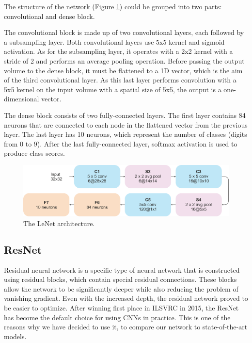 The structure of the network (Figure \ref{img:lenet}) could be grouped into two parts: convolutional and dense block. 

The convolutional block is made up of two convolutional layers, each followed by a subsampling layer. Both convolutional layers use 5x5 kernel and sigmoid activation. As for the subsampling layer, it operates with a 2x2 kernel with a stride of 2 and performs an average pooling operation. Before passing the output volume to the dense block, it must be flattened to a 1D vector, which is the aim of the third convolutional layer. As this last layer performs convolution with a 5x5 kernel on the input volume with a spatial size of 5x5, the output is a one-dimensional vector.  

The dense block consists of two fully-connected layers. The first layer contains 84 neurons that are connected to each node in the flattened vector from the previous layer. The last layer has 10 neurons, which represent the number of classes (digits from 0 to 9). After the last fully-connected layer, softmax activation is used to produce class scores. 

\begin{figure}[h]
    \centering
    \includegraphics[width=.8\textwidth]{images/lenet.png}
    \caption{The LeNet architecture.}
    \label{img:lenet}
\end{figure}

\subsection{ResNet}

Residual neural network \cite{resnet2015} is a specific type of neural network that is constructed using residual blocks, which contain special residual connections. These blocks allow the network to be significantly deeper while also reducing the problem of vanishing gradient. Even with the increased depth, the residual network proved to be easier to optimize. After winning first place in ILSVRC \cite{ILSVRC} in 2015, the ResNet has become the default choice for using CNNs in practice. This is one of the reasons why we have decided to use it, to compare our network to state-of-the-art models.  

